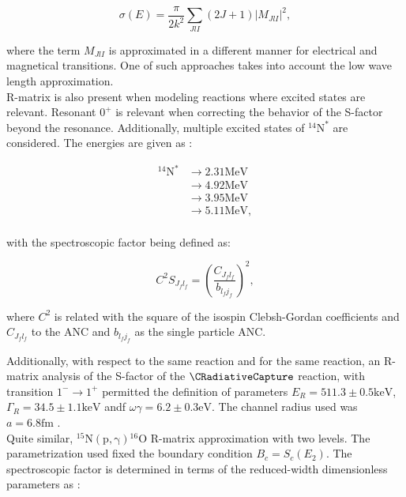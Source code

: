 \documentclass[openany]{book}
\begin{document}
\begin{equation}\label{eq:rmatrix_crossSection_m}
	\sigma(E) = \frac{\pi}{2k^2} \sum_{JlI} (2J + 1) |M_{JlI}|^2,
\end{equation}

where the term $M_{JlI}$ is approximated in a different manner for electrical and magnetical transitions. One of such approaches takes into account the low wave length approximation.  \\

R-matrix is also present when modeling reactions where excited states are relevant. Resonant $0^{+}$ is relevant when correcting the behavior of the S-factor beyond the resonance. Additionally, multiple excited states of $\mathrm{{}^{14}N^{*}}$ are considered. The energies are given as \cite{chakraborty_deboer_mukherjee_roy_2015}: 

\begin{equation}\label{eq:rmatrix_excited_14N}
	\begin{split}
		\mathrm{{}^{14}N^{*}} & \rightarrow 2.31\mathrm{MeV} \\
		& \rightarrow 4.92\mathrm{MeV} \\
		& \rightarrow 3.95\mathrm{MeV} \\
		& \rightarrow 5.11\mathrm{MeV}, \\
	\end{split}
\end{equation}

with the spectroscopic factor being defined as:

\begin{equation}\label{eq:rmatrix_spectroscopic_parametrization}
	C^2S_{J_f l_f} =  \left (\frac{C_{J_fl_f}}{b_{l_fj_f}} \right)^2,
\end{equation}

where $C^2$ is related with the square of the isospin Clebsh-Gordan coefficients and $C_{J_fl_f}$ to the ANC and $b_{l_fj_f}$ as the single particle ANC.

Additionally, with respect to the same reaction and  for the same reaction, an R-matrix analysis of the S-factor of the $\CRadiativeCapture$ reaction, with transition $1^{-} \rightarrow 1^{+}$ permitted the definition of parameters $E_R = 511.3 \pm 0.5 \mathrm{keV}$, $\Gamma_R = 34.5 \pm 1.1 \mathrm{keV}$ andf $\omega \gamma = 6.2 \pm 0.3 \mathrm{eV}$. The channel radius used was $a = 6.8 \mathrm{fm}$ \cite{genard_descouvemont_terwagne_2010}. \\

Quite similar, $\mathrm{{}^{15}N(p, \gamma) {}^{16}O}$ R-matrix approximation with two levels. The parametrization used fixed the boundary condition $B_c = S_c(E_2)$. The spectroscopic factor is determined in terms of the reduced-width dimensionless parameters as  \cite{barker_2008}:  
\end{document}
